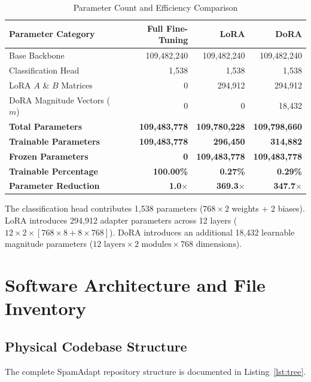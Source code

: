 \documentclass[conference]{IEEEtran}
\begin{document}
\begin{table}[htbp]
\caption{Parameter Count and Efficiency Comparison}
\label{tab:param_breakdown}
\centering
\begin{tabular}{lrrr}
\toprule
\textbf{Parameter Category} & \textbf{Full Fine-Tuning} & \textbf{LoRA} & \textbf{DoRA} \\
\midrule
Base Backbone & 109,482,240 & 109,482,240 & 109,482,240 \\
Classification Head & 1,538 & 1,538 & 1,538 \\
LoRA $A$ \& $B$ Matrices & 0 & 294,912 & 294,912 \\
DoRA Magnitude Vectors ($m$) & 0 & 0 & 18,432 \\
\midrule
\textbf{Total Parameters} & \textbf{109,483,778} & \textbf{109,780,228} & \textbf{109,798,660} \\
\textbf{Trainable Parameters} & \textbf{109,483,778} & \textbf{296,450} & \textbf{314,882} \\
\textbf{Frozen Parameters} & \textbf{0} & \textbf{109,483,778} & \textbf{109,483,778} \\
\textbf{Trainable Percentage} & \textbf{100.00\%} & \textbf{0.27\%} & \textbf{0.29\%} \\
\textbf{Parameter Reduction} & \textbf{1.0$\times$} & \textbf{369.3$\times$} & \textbf{347.7$\times$} \\
\bottomrule
\end{tabular}
\end{table}

The classification head contributes 1,538 parameters ($768 \times 2$ weights + 2 biases). LoRA introduces 294,912 adapter parameters across 12 layers ($12 \times 2 \times [768 \times 8 + 8 \times 768]$). DoRA introduces an additional 18,432 learnable magnitude parameters ($12 \text{ layers} \times 2 \text{ modules} \times 768 \text{ dimensions}$).

\section{Software Architecture and File Inventory}
\label{sec:software_arch}

\subsection{Physical Codebase Structure}
The complete SpamAdapt repository structure is documented in Listing~\ref{lst:tree}.
\end{document}
